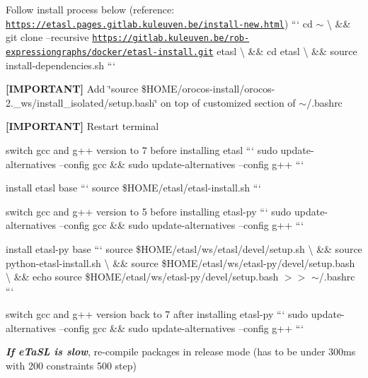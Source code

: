 
\begin{DoxyItemize}
\item Follow install process below (reference\+: \href{https://etasl.pages.gitlab.kuleuven.be/install-new.html}{\tt https\+://etasl.\+pages.\+gitlab.\+kuleuven.\+be/install-\/new.\+html}) ``` cd $\sim$ \textbackslash{} \&\& git clone --recursive \href{https://gitlab.kuleuven.be/rob-expressiongraphs/docker/etasl-install.git}{\tt https\+://gitlab.\+kuleuven.\+be/rob-\/expressiongraphs/docker/etasl-\/install.\+git} etasl \textbackslash{} \&\& cd etasl \textbackslash{} \&\& source install-\/dependencies.\+sh ```
\item {\bfseries \mbox{[}I\+M\+P\+O\+R\+T\+A\+NT\mbox{]}} Add \char`\"{}source \$\+H\+O\+M\+E/orocos-\/install/orocos-\/2.\+\_\+ws/install\+\_\+isolated/setup.\+bash\char`\"{} on top of customized section of $\sim$/.bashrc
\item {\bfseries \mbox{[}I\+M\+P\+O\+R\+T\+A\+NT\mbox{]}} Restart terminal
\item switch gcc and g++ version to 7 before installing etasl ``` sudo update-\/alternatives --config gcc \&\& sudo update-\/alternatives --config g++ ```
\item install etasl base ``` source \$\+H\+O\+ME/etasl/etasl-\/install.sh ```
\item switch gcc and g++ version to 5 before installing etasl-\/py ``` sudo update-\/alternatives --config gcc \&\& sudo update-\/alternatives --config g++ ```
\item install etasl-\/py base ``` source \$\+H\+O\+ME/etasl/ws/etasl/devel/setup.sh \textbackslash{} \&\& source python-\/etasl-\/install.\+sh \textbackslash{} \&\& source \$\+H\+O\+ME/etasl/ws/etasl-\/py/devel/setup.bash \textbackslash{} \&\& echo \textquotesingle{}source \$\+H\+O\+ME/etasl/ws/etasl-\/py/devel/setup.bash\textquotesingle{} $>$$>$ $\sim$/.bashrc ```
\item switch gcc and g++ version back to 7 after installing etasl-\/py ``` sudo update-\/alternatives --config gcc \&\& sudo update-\/alternatives --config g++ ```
\item {\itshape {\bfseries If e\+Ta\+SL is slow}}, re-\/compile packages in release mode (has to be under 300ms with 200 constraints 500 step) 
\end{DoxyItemize}